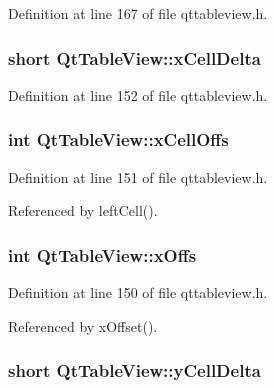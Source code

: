 Definition at line 167 of file qttableview.\+h.

\hypertarget{classQtTableView_a6f95c33c17b2a09ab643ff439c31997c}{
\subsubsection[{x\+Cell\+Delta}]{\setlength{\rightskip}{0pt plus 5cm}short Qt\+Table\+View\+::x\+Cell\+Delta\hspace{0.3cm}{\ttfamily [private]}}}\label{classQtTableView_a6f95c33c17b2a09ab643ff439c31997c}


Definition at line 152 of file qttableview.\+h.

\hypertarget{classQtTableView_a83a6f60a373bdb2b71328e1e74dff7d9}{
\subsubsection[{x\+Cell\+Offs}]{\setlength{\rightskip}{0pt plus 5cm}int Qt\+Table\+View\+::x\+Cell\+Offs\hspace{0.3cm}{\ttfamily [private]}}}\label{classQtTableView_a83a6f60a373bdb2b71328e1e74dff7d9}


Definition at line 151 of file qttableview.\+h.



Referenced by left\+Cell().

\hypertarget{classQtTableView_ad9a6e9303fefd925b8d92822f3930afa}{
\subsubsection[{x\+Offs}]{\setlength{\rightskip}{0pt plus 5cm}int Qt\+Table\+View\+::x\+Offs\hspace{0.3cm}{\ttfamily [private]}}}\label{classQtTableView_ad9a6e9303fefd925b8d92822f3930afa}


Definition at line 150 of file qttableview.\+h.



Referenced by x\+Offset().

\hypertarget{classQtTableView_af545e1ce3c1176406d8bd260cc03e207}{
\subsubsection[{y\+Cell\+Delta}]{\setlength{\rightskip}{0pt plus 5cm}short Qt\+Table\+View\+::y\+Cell\+Delta\hspace{0.3cm}{\ttfamily [private]}}}\label{classQtTableView_af545e1ce3c1176406d8bd260cc03e207}


